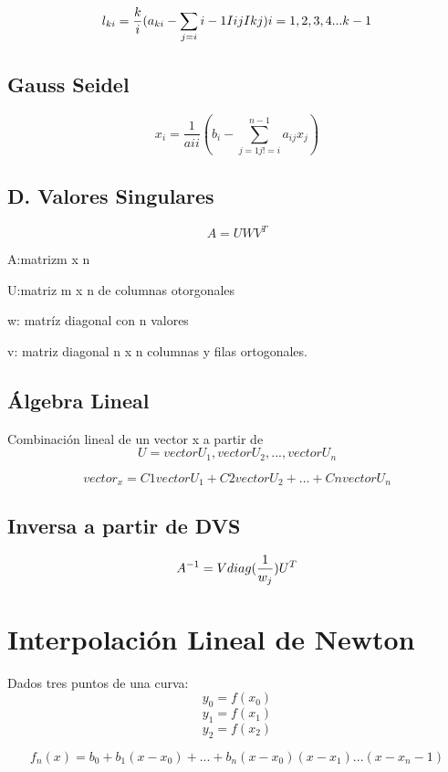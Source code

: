    $$
   l_{ki} = \frac{k}{i} (a_{ki} -  \sum_{j=i}{ i-1} I{ij}I{kj}  ) \space i = 1,2,3,4...k-1
   $$
   
   \subsection{Gauss Seidel}
   
   $$
   	x_i = \frac{1}{aii}  ( b_i - \sum_{j=1 j != i }^{n-1} a_{ij}x_j )
   $$
   
   \subsection{D. Valores Singulares}
   $$
   A = UWV^T
   $$

   	A:\space matriz\space m \space x \space n
 
   	U:\space matriz \space m \space x  \space n  \space de \space columnas  \space otorgonales
   
   	w: \space matríz  \space diagonal \space con \space n  \space valores
   
   v: \space matriz \space diagonal \space n \space x \space n  \space columnas \space y \space filas ortogonales.
	
    
    \subsection{Álgebra Lineal}
    Combinación lineal de  un vector x a partir de 
    $$
    	U = { vectorU_1, vectorU_2, ... ,vectorU_n }
    $$
    
    $$
    	vector_x = C1 vectorU_1 + C2 vectorU_2 +  ... + Cn vectorU_n  
    $$
    
    \subsection{Inversa a partir de DVS}
    
    $$
    	A^{-1} = V \space diag(\frac{1}{w_j}) U^T
    $$
    
    
    \section{Interpolación Lineal de Newton}
    Dados tres puntos de una curva: 
    $$
    	y_0 = f(x_0)
    $$
    $$
    	y_1 = f(x_1)
    $$
    $$
    	y_2 = f(x_2)
    $$
    
    $$
    	f_n(x) = b_0 + b_1(x-x_0)  + ... + b_n(x-x_0)(x-x_1) ... (x-x_n-1) 
    $$
    
